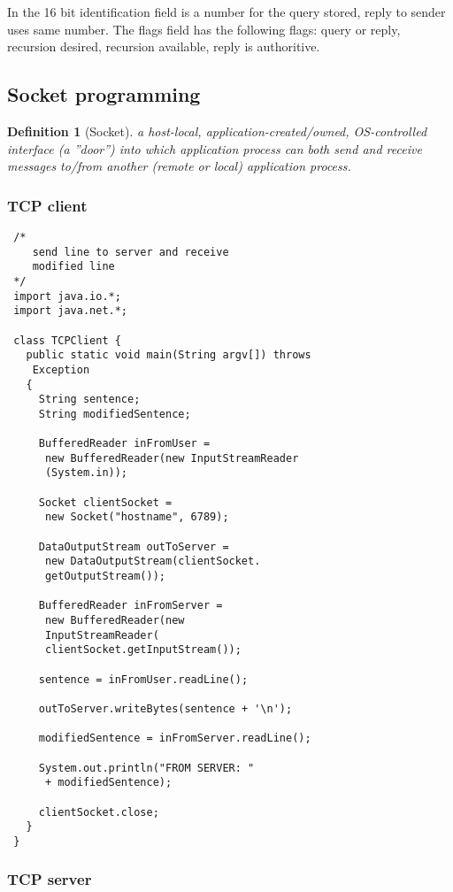 \documentclass[10pt, a4paper, twocolumn]{scrartcl}
\newtheorem{definition}{Definition}
\begin{document}
In the 16 bit identification field is a number for the query stored, reply to sender uses same number. The flags field has the following flags: query or reply, recursion desired, recursion available, reply is authoritive.

\subsection{Socket programming}

\begin{definition}[Socket]
	a host-local, application-created/owned, OS-controlled interface (a ''door'') into which application process can both send and receive messages to/from another (remote or local) application process.
\end{definition}

\subsubsection{TCP client}

\begin{verbatim}
 /*
    send line to server and receive
    modified line 
 */
 import java.io.*;
 import java.net.*;

 class TCPClient {
   public static void main(String argv[]) throws
    Exception
   {
     String sentence;
     String modifiedSentence;

     BufferedReader inFromUser =
      new BufferedReader(new InputStreamReader
      (System.in));
     
     Socket clientSocket =
      new Socket("hostname", 6789);

     DataOutputStream outToServer =
      new DataOutputStream(clientSocket.
      getOutputStream());

     BufferedReader inFromServer =
      new BufferedReader(new
      InputStreamReader(
      clientSocket.getInputStream());

     sentence = inFromUser.readLine();

     outToServer.writeBytes(sentence + '\n');

     modifiedSentence = inFromServer.readLine();
     
     System.out.println("FROM SERVER: "
      + modifiedSentence);

     clientSocket.close;
   }
 }
\end{verbatim}

\subsubsection{TCP server}
\end{document}
